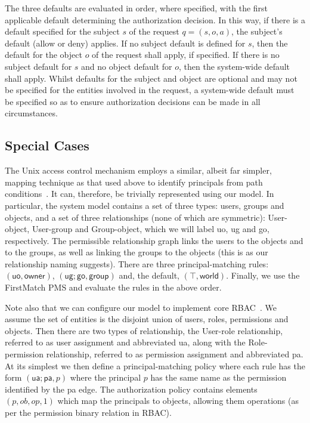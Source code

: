 \documentclass{article}
\newcommand{\comp}{\mathbin{;}}
\begin{document}
The three defaults are evaluated in order, where specified, with the first applicable default determining the authorization decision. In this way, if there is a default specified for the subject $s$ of the request $q = (s,o,a)$, the subject's default (allow or deny) applies. If no subject default is defined for $s$, then the default for the object $o$ of the request shall apply, if specified. If there is no subject default for $s$ and no object default for $o$, then the system-wide default shall apply. Whilst defaults for the subject and object are optional and may not be specified for the entities involved in the request, a system-wide default must be specified so as to ensure authorization decisions can be made in all circumstances.

\subsection{Special Cases}\label{sec:AuthZModel:Ex}

The Unix access control mechanism employs a similar, albeit far simpler, mapping technique as that used above to identify principals from path conditions~\cite{Crampton_UnixAccessControl}. It can, therefore, be trivially represented using our model.
In particular, the system model contains a set of three types: users, groups and objects, and a set of three relationships (none of which are symmetric): \textsf{User-object}, \textsf{User-group} and \textsf{Group-object}, which we will label \textsf{uo}, \textsf{ug} and \textsf{go}, respectively.
The permissible relationship graph links the users to the objects and to the groups, as well as linking the groups to the objects (this is as our relationship naming suggests).
There are three principal-matching rules: $(\textsf{uo}, \textsf{owner})$, $(\textsf{ug} \comp \textsf{go},\textsf{group})$ and, the default, $(\top,\textsf{world})$.
Finally, we use the \textsf{FirstMatch} PMS and evaluate the rules in the above order.

Note also that we can configure our model to implement core RBAC~\cite{ANSI_RBAC}.
We assume the set of entities is the disjoint union of users, roles, permissions and objects.
Then there are two types of relationship, the \textsf{User-role} relationship, referred to as user assignment and abbreviated \textsf{ua}, along with the \textsf{Role-permission} relationship, referred to as permission assignment and abbreviated \textsf{pa}.
At its simplest we then define a principal-matching policy where each rule has the form $(\textsf{ua} \comp \textsf{pa},p)$ where the principal $p$ has the same name as the permission identified by the \textsf{pa} edge.
The authorization policy contains elements $(p,ob,op,1)$ which map the principals to objects, allowing them operations (as per the permission binary relation in RBAC).
\end{document}

